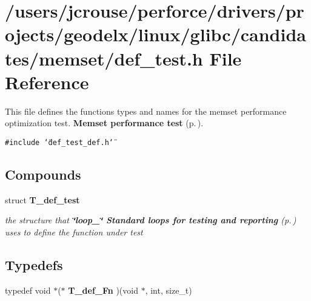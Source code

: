 \section{/users/jcrouse/perforce/drivers/projects/geodelx/linux/glibc/candidates/memset/def\_\-test.h File Reference}
\label{memset_2def__test_8h}
This file defines the functions types and names for the memset performance optimization test. {\bf Memset performance test} {\rm (p.\,\pageref{group__memset__test})}. 


{\tt \#include \char`\"{}def\_\-test\_\-def.h\char`\"{}}\par
\subsection*{Compounds}
\begin{CompactItemize}
\item 
struct {\bf T\_\-def\_\-test}
\begin{CompactList}\small\item\em the structure that {\bf \char`\"{}loop\_\-\char`\"{} Standard loops for testing and reporting} {\rm (p.\,\pageref{group__loop__test})} uses to define the function under test\item\end{CompactList}\end{CompactItemize}
\subsection*{Typedefs}
\begin{CompactItemize}
\item 
typedef void $\ast$($\ast$ {\bf T\_\-def\_\-Fn} )(void $\ast$, int, size\_\-t)
\end{CompactItemize}
